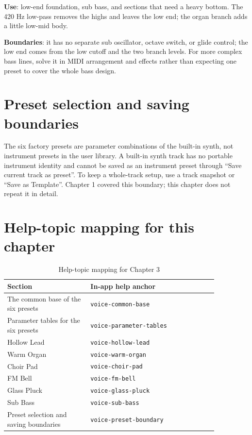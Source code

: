 \textbf{Use}: low-end foundation, sub bass, and sections that need a heavy bottom.
The 420 Hz low-pass removes the highs and leaves the low end; the organ branch
adds a little low-mid body.

\textbf{Boundaries}: it has no separate sub oscillator, octave switch, or glide
control; the low end comes from the low cutoff and the two branch levels. For more
complex bass lines, solve it in MIDI arrangement and effects rather than expecting
one preset to cover the whole bass design.

\section{Preset selection and saving boundaries}

The six factory presets are parameter combinations of the built-in synth, not
instrument presets in the user library. A built-in synth track has no portable
instrument identity and cannot be saved as an instrument preset through ``Save
current track as preset''. To keep a whole-track setup, use a track snapshot or
``Save as Template''. Chapter 1 covered this boundary; this chapter does not repeat
it in detail.

\section{Help-topic mapping for this chapter}

\begin{table}[htbp]
\centering
\small
\begin{tabular}{@{}p{0.34\linewidth}p{0.52\linewidth}@{}}
\hline
Section & In-app help anchor \\
\hline
The common base of the six presets & \texttt{voice-common-base} \\
Parameter tables for the six presets & \texttt{voice-parameter-tables} \\
Hollow Lead & \texttt{voice-hollow-lead} \\
Warm Organ & \texttt{voice-warm-organ} \\
Choir Pad & \texttt{voice-choir-pad} \\
FM Bell & \texttt{voice-fm-bell} \\
Glass Pluck & \texttt{voice-glass-pluck} \\
Sub Bass & \texttt{voice-sub-bass} \\
Preset selection and saving boundaries & \texttt{voice-preset-boundary} \\
\hline
\end{tabular}
\caption{Help-topic mapping for Chapter 3}
\end{table}

